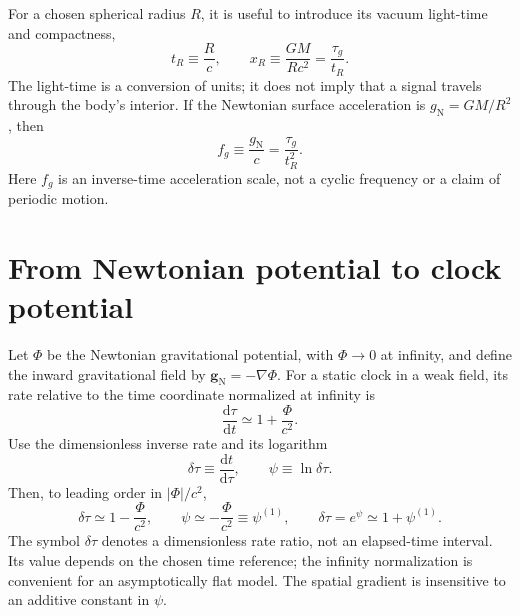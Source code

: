 \documentclass[12pt]{article}
\begin{document}
For a chosen spherical radius $R$, it is useful to introduce its vacuum light-time and compactness,
\begin{equation}
  t_R\equiv\frac{R}{c},
  \qquad
  x_R\equiv\frac{GM}{Rc^2}=\frac{\tau_g}{t_R}.
  \label{eq:compactness}
\end{equation}
The light-time is a conversion of units; it does not imply that a signal travels through the body's interior. If the Newtonian surface acceleration is $g_{\mathrm{N}}=GM/R^2$, then
\begin{equation}
  f_g\equiv\frac{g_{\mathrm{N}}}{c}
  =\frac{\tau_g}{t_R^2}.
  \label{eq:fg}
\end{equation}
Here $f_g$ is an inverse-time acceleration scale, not a cyclic frequency or a claim of periodic motion.

\section{From Newtonian potential to clock potential}

Let $\Phi$ be the Newtonian gravitational potential, with $\Phi\to0$ at infinity, and define the inward gravitational field by $\mathbf{g}_{\mathrm{N}}=-\nabla\Phi$. For a static clock in a weak field, its rate relative to the time coordinate normalized at infinity is
\begin{equation}
  \frac{\mathrm{d}\tau}{\mathrm{d}t}
  \simeq1+\frac{\Phi}{c^2}.
  \label{eq:static-rate}
\end{equation}
Use the dimensionless inverse rate and its logarithm
\begin{equation}
  \delta\tau\equiv\frac{\mathrm{d}t}{\mathrm{d}\tau},
  \qquad
  \psi\equiv\ln\delta\tau.
  \label{eq:clock-potential}
\end{equation}
Then, to leading order in $|\Phi|/c^2$,
\begin{equation}
  \delta\tau\simeq1-\frac{\Phi}{c^2},
  \qquad
  \psi\simeq-\frac{\Phi}{c^2}\equiv\psi^{(1)},
  \qquad
  \delta\tau=e^{\psi}\simeq1+\psi^{(1)}.
  \label{eq:weak-clock-potential}
\end{equation}
The symbol $\delta\tau$ denotes a dimensionless rate ratio, not an elapsed-time interval. Its value depends on the chosen time reference; the infinity normalization is convenient for an asymptotically flat model. The spatial gradient is insensitive to an additive constant in $\psi$.
\end{document}
